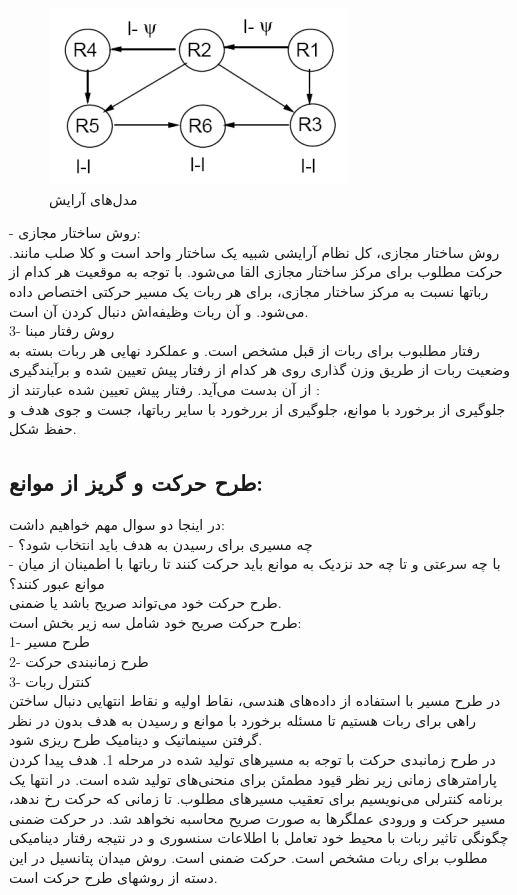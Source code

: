 \begin{figure}[h]
	\centering
	\includegraphics[width=0.7\linewidth]{images/1_1}
	\caption{مدل‌های آرایش}
	\label{fig:11}
\end{figure}
\noindent{}- روش ساختار مجازی:
\\
روش ساختار مجازی، کل نظام آرایشی شبیه یک ساختار واحد است و کلا صلب مانند. حرکت مطلوب برای مرکز ساختار مجازی القا می‌شود. با توجه به موقعیت هر کدام از رباتها نسبت به مرکز ساختار مجازی، برای هر ربات یک مسیر حرکتی اختصاص داده می‌شود. و آن ربات وظیفه‌اش دنبال کردن آن است.
\\
3- روش رفتار مبنا 
\\
رفتار مطلبوب برای ربات از قبل مشخص است. و عملکرد نهایی هر ربات بسته به وضعیت ربات از طریق وزن گذاری روی هر کدام از رفتار پیش تعیین شده و برآیندگیری از آن بدست می‌آید.
رفتار پیش تعیین شده عبارتند از :
\\
جلوگیری از برخورد با موانع، جلوگیری از بررخورد با سایر رباتها، جست و جوی هدف و حفظ شکل.

\subsection{طرح حرکت و گریز از موانع:}
در اینجا دو سوال مهم خواهیم داشت:
\\
- چه مسیری برای رسیدن به هدف باید انتخاب شود؟
\\
- با چه سرعتی و تا چه حد نزدیک به موانع باید حرکت کنند تا رباتها با اطمینان از میان موانع عبور کنند؟
\\
طرح حرکت خود می‌تواند صریح باشد یا ضمنی.
\\
طرح حرکت صریح خود شامل سه زیر بخش است:
\\
1- طرح مسیر
\\
2- طرح زمانبندی حرکت
\\
3- کنترل ربات
\\
در طرح مسیر با استفاده از داده‌های هندسی، نقاط اولیه و نقاط انتهایی دنبال ساختن راهی برای ربات هستیم تا مسئله برخورد با موانع و رسیدن به هدف بدون در نظر گرفتن سینماتیک و دینامیک طرح ریزی شود.
\\
در طرح زمانبدی حرکت با توجه به مسیرهای تولید شده در مرحله 1. هدف پیدا کردن پارامترهای زمانی زیر نظر قیود مطمئن برای منحنی‌های تولید شده است.
در انتها یک برنامه کنترلی می‌نویسیم برای تعقیب مسیرهای مطلوب.
تا زمانی که حرکت رخ ندهد، مسیر حرکت و ورودی عملگرها به صورت صریح محاسبه نخواهد شد. در حرکت ضمنی چگونگی تاثیر ربات با محیط خود تعامل با اطلاعات سنسوری و در نتیجه رفتار دینامیکی مطلوب برای ربات مشخص است. حرکت ضمنی 
است. روش میدان پتانسیل در این دسته از روشهای طرح حرکت است.
